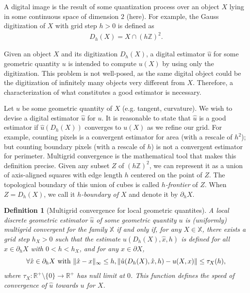 \documentclass[runningheads]{llncs}
\newtheorem{ddef}{Definition}
\DeclarePairedDelimiter\norm{\lVert}{\rVert}%
\begin{document}
A digital image is the result of some quantization process over an object $X$ lying in some continuous space of
dimension $2$ (here).  For example, the Gauss digitization of $X$ with grid step $h>0$ is defined as
\begin{align*}
	D_h(X) = X \cap (h\mathbb{Z})^2.
\end{align*} 

Given an object $X$ and its digitization $D_h(X)$, a digital estimator $\hat{u}$ for some geometric quantity $u$ is
intended to compute $u(X)$ by using only the digitization. This problem is not well-posed, as the same digital object
could be the digitization of infinitely many objects very different from $X$. Therefore, a characterization of what constitutes
a good estimator is necessary.

Let $u$ be some geometric quantity of $X$ (e.g. tangent, curvature). We wish to devise a digital estimator $\hat{u}$ for
$u$. It is reasonable to state that $\hat{u}$ is a good estimator if $\hat{u}(D_h(X))$ converges to $u(X)$ as we refine
our grid. For example, counting pixels is a convergent estimator for area (with a rescale of $h^2$); but counting
boundary pixels (with a rescale of $h$) is not a convergent estimator for perimeter. Multigrid convergence is the
mathematical tool that makes this definition precise. Given any subset $Z$ of $(h\mathbb{Z})^2$, we can represent it as a
union of axis-aligned squares with edge length $h$ centered on the point of $Z$. The topological boundary of this union
of cubes is called {\em $h$-frontier} of $Z$. When $Z=D_h(X)$, we call it {\em $h$-boundary of $X$} and denote it by
$\partial_h X$.

\begin{ddef}[Multigrid convergence for local geometric quantites]
  A local discrete geometric estimator $\hat{u}$ of some geometric
  quantity $u$ is (uniformly) multigrid convergent for the family $\mathbb{X}$ if
  and only if, for any $X \in \mathbb{X}$, there exists a grid step
  $h_X>0$ such that the estimate $\hat{u}(D_h(X),\hat{x},h)$ is
  defined for all $\hat{x} \in \partial_hX$ with $ 0 < h < h_X$, and
  for any $x \in \partial X$,
  \begin{equation*}
    \forall \hat{x} \in  \partial_hX \text{ with } \norm{ \hat{x} - x }_{\infty} \leq h, \norm{ \hat{u}(D_h(X),\hat{x},h) - u(X,x)} \leq \tau_{X}(h),			
  \end{equation*}
  where $\tau_{X}:\mathbb{R}^{+}\setminus\{0\} \rightarrow
  \mathbb{R}^{+}$ has null limit at $0$. This function defines the
  speed of convergence of $\hat{u}$ towards $u$ for $X$.
\end{ddef}
	
\end{document}
